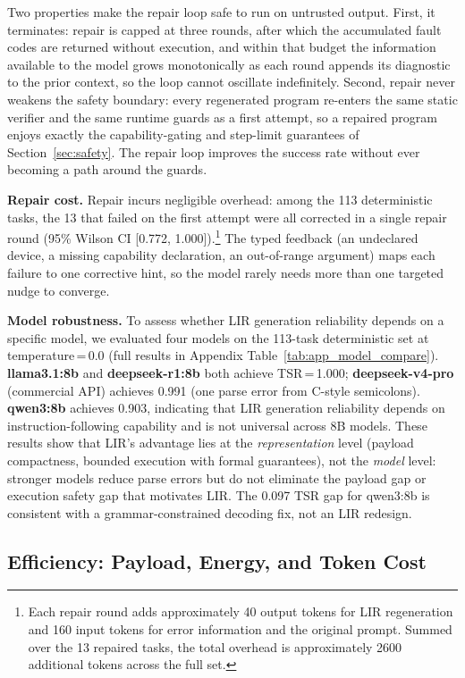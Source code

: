 \documentclass[a4paper,fleqn,longmktitle]{cas-dc}
\begin{document}
Two properties make the repair loop safe to run on untrusted output. First, it terminates: repair is capped at three rounds, after which the accumulated fault codes are returned without execution, and within that budget the information available to the model grows monotonically as each round appends its diagnostic to the prior context, so the loop cannot oscillate indefinitely. Second, repair never weakens the safety boundary: every regenerated program re-enters the same static verifier and the same runtime guards as a first attempt, so a repaired program enjoys exactly the capability-gating and step-limit guarantees of Section~\ref{sec:safety}. The repair loop improves the success rate without ever becoming a path around the guards.

\textbf{Repair cost.} Repair incurs negligible overhead: among the 113 deterministic tasks, the 13 that failed on the first attempt were all corrected in a single repair round (95\% Wilson CI [0.772, 1.000]).\footnote{Each repair round adds approximately 40 output tokens for LIR regeneration and 160 input tokens for error information and the original prompt. Summed over the 13 repaired tasks, the total overhead is approximately 2600 additional tokens across the full set.} The typed feedback (an undeclared device, a missing capability declaration, an out-of-range argument) maps each failure to one corrective hint, so the model rarely needs more than one targeted nudge to converge.

\textbf{Model robustness.} To assess whether LIR generation reliability depends on a specific model, we evaluated four models on the 113-task deterministic set at temperature\,=\,0.0 (full results in Appendix Table~\ref{tab:app_model_compare}). \textbf{llama3.1:8b} and \textbf{deepseek-r1:8b} both achieve TSR\,=\,1.000; \textbf{deepseek-v4-pro} (commercial API) achieves 0.991 (one parse error from C-style semicolons). \textbf{qwen3:8b} achieves 0.903, indicating that LIR generation reliability depends on instruction-following capability and is not universal across 8B models. These results show that LIR's advantage lies at the \emph{representation} level (payload compactness, bounded execution with formal guarantees), not the \emph{model} level: stronger models reduce parse errors but do not eliminate the payload gap or execution safety gap that motivates LIR. The 0.097 TSR gap for qwen3:8b is consistent with a grammar-constrained decoding fix, not an LIR redesign.

\subsection{Efficiency: Payload, Energy, and Token Cost}
\label{sec:exp1}
\end{document}
